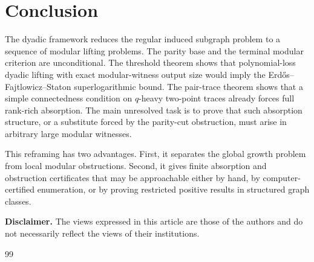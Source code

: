\documentclass[thmsec,dntnbr,nolinenbrs]{dmgt}
\numberwithin{equation}{section}
\begin{document}
\section{Conclusion}

The dyadic framework reduces the regular induced subgraph problem to a sequence of modular lifting problems.  The parity base and the terminal modular criterion are unconditional.  The threshold theorem shows that polynomial-loss dyadic lifting with exact modular-witness output size would imply the Erd\H{o}s--Fajtlowicz--Staton superlogarithmic bound.  The pair-trace theorem shows that a simple connectedness condition on \(q\)-heavy two-point traces already forces full rank-rich absorption.  The main unresolved task is to prove that such absorption structure, or a substitute forced by the parity-cut obstruction, must arise in arbitrary large modular witnesses.

This reframing has two advantages.  First, it separates the global growth problem from local modular obstructions.  Second, it gives finite absorption and obstruction certificates that may be approachable either by hand, by computer-certified enumeration, or by proving restricted positive results in structured graph classes.

\medskip
\noindent\textbf{Disclaimer.}
The views expressed in this article are those of the authors and do not necessarily reflect the views of their institutions.

\begin{thebibliography}{99}









\end{thebibliography}
\end{document}

